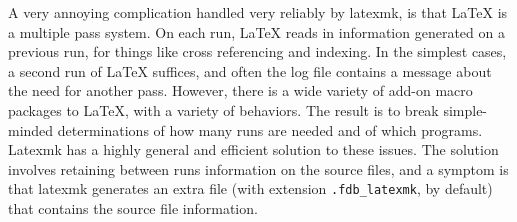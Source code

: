 A  very annoying complication handled very reliably by latexmk, is that LaTeX
is a multiple pass system.  On each run, LaTeX reads in  information
generated on a previous run, for things like cross referencing and indexing.
In the simplest cases, a second run of LaTeX  suffices,  and often  the log
file contains a message about the need for another pass.  However, there is a
wide variety of add-on  macro  packages  to  LaTeX, with  a variety of
behaviors.  The result is to break simple-minded determinations of how many
runs are needed and of  which  programs.   Latexmk has a highly general and
efficient solution to these issues.  The solution involves retaining between
runs  information  on  the  source files,  and a symptom is that latexmk
generates an extra file (with extension \verb|.fdb_latexmk|, by default) that
contains the source file  information.


  
